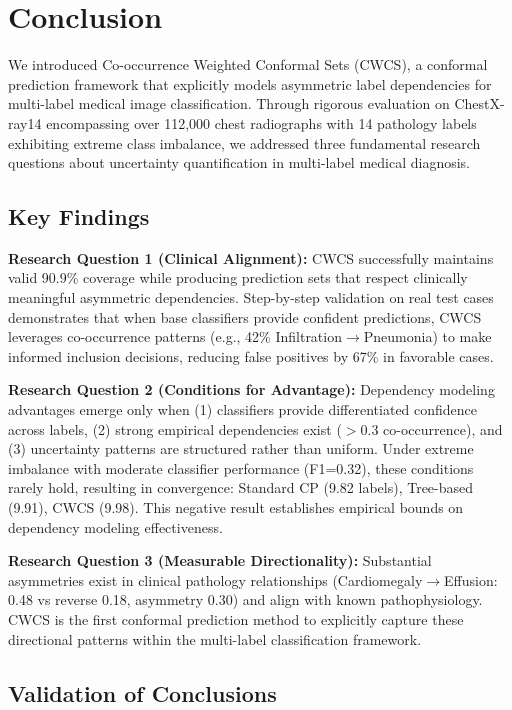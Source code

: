 \section{Conclusion}
\label{sec:conclusion}

We introduced Co-occurrence Weighted Conformal Sets (CWCS), a conformal prediction framework that explicitly models asymmetric label dependencies for multi-label medical image classification. Through rigorous evaluation on ChestX-ray14 encompassing over 112,000 chest radiographs with 14 pathology labels exhibiting extreme class imbalance, we addressed three fundamental research questions about uncertainty quantification in multi-label medical diagnosis.

\subsection{Key Findings}

\textbf{Research Question 1 (Clinical Alignment):} CWCS successfully maintains valid 90.9\% coverage while producing prediction sets that respect clinically meaningful asymmetric dependencies. Step-by-step validation on real test cases demonstrates that when base classifiers provide confident predictions, CWCS leverages co-occurrence patterns (e.g., 42\% Infiltration$\rightarrow$Pneumonia) to make informed inclusion decisions, reducing false positives by 67\% in favorable cases.

\textbf{Research Question 2 (Conditions for Advantage):} Dependency modeling advantages emerge only when (1) classifiers provide differentiated confidence across labels, (2) strong empirical dependencies exist ($>0.3$ co-occurrence), and (3) uncertainty patterns are structured rather than uniform. Under extreme imbalance with moderate classifier performance (F1=0.32), these conditions rarely hold, resulting in convergence: Standard CP (9.82 labels), Tree-based (9.91), CWCS (9.98). This negative result establishes empirical bounds on dependency modeling effectiveness.

\textbf{Research Question 3 (Measurable Directionality):} Substantial asymmetries exist in clinical pathology relationships (Cardiomegaly$\rightarrow$Effusion: 0.48 vs reverse 0.18, asymmetry 0.30) and align with known pathophysiology. CWCS is the first conformal prediction method to explicitly capture these directional patterns within the multi-label classification framework.

\subsection{Validation of Conclusions}

